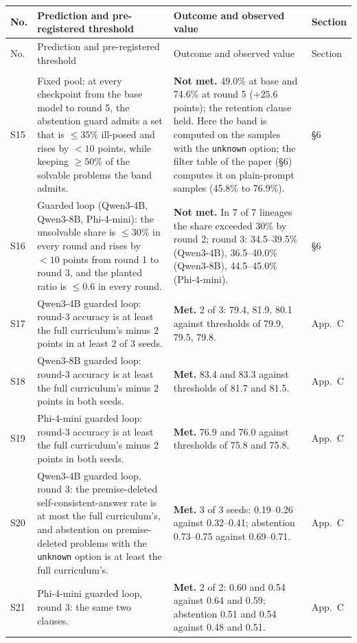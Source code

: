\documentclass[10pt,a4paper]{article}
\makeatletter
\newcommand{\unk}{\texttt{unknown}}
\newcommand{\met}{\textbf{Met.}}
\newcommand{\nmet}{\textbf{Not met.}}
\newcommand{\sub}[1]{\multicolumn{4}{@{}l}{\emph{#1}}\\\addlinespace[1pt]}
\makeatother
\begin{document}
\begingroup\small
\begin{longtable}{@{}L{0.9cm}L{7.8cm}L{6.1cm}L{1.3cm}@{}}
\toprule
No. & Prediction and pre-registered threshold & Outcome and observed value & Section \\
\midrule
\endfirsthead
\toprule
No. & Prediction and pre-registered threshold & Outcome and observed value & Section \\
\midrule
\endhead
\bottomrule
\endfoot
\sub{Abstention guard}
S15 & Fixed pool: at every checkpoint from the base model to round 5, the abstention guard admits a set that is $\le 35\%$ ill-posed and rises by $< 10$ points, while keeping $\ge 50\%$ of the solvable problems the band admits. & \nmet{} 49.0\% at base and 74.6\% at round 5 ($+25.6$ points); the retention clause held. Here the band is computed on the samples with the \unk{} option; the filter table of the paper (\S6) computes it on plain-prompt samples (45.8\% to 76.9\%). & \S6 \\
S16 & Guarded loop (Qwen3-4B, Qwen3-8B, Phi-4-mini): the unsolvable share is $\le 30\%$ in every round and rises by $< 10$ points from round 1 to round 3, and the planted ratio is $\le 0.6$ in every round. & \nmet{} In 7 of 7 lineages the share exceeded 30\% by round 2; round 3: 34.5--39.5\% (Qwen3-4B), 36.5--40.0\% (Qwen3-8B), 44.5--45.0\% (Phi-4-mini). & \S6 \\
S17 & Qwen3-4B guarded loop: round-3 accuracy is at least the full curriculum's minus 2 points in at least 2 of 3 seeds. & \met{} 2 of 3: 79.4, 81.9, 80.1 against thresholds of 79.9, 79.5, 79.8. & App.~C \\
S18 & Qwen3-8B guarded loop: round-3 accuracy is at least the full curriculum's minus 2 points in both seeds. & \met{} 83.4 and 83.3 against thresholds of 81.7 and 81.5. & App.~C \\
S19 & Phi-4-mini guarded loop: round-3 accuracy is at least the full curriculum's minus 2 points in both seeds. & \met{} 76.9 and 76.0 against thresholds of 75.8 and 75.8. & App.~C \\
S20 & Qwen3-4B guarded loop, round 3: the premise-deleted self-consistent-answer rate is at most the full curriculum's, and abstention on premise-deleted problems with the \unk{} option is at least the full curriculum's. & \met{} 3 of 3 seeds: 0.19--0.26 against 0.32--0.41; abstention 0.73--0.75 against 0.69--0.71. & App.~C \\
S21 & Phi-4-mini guarded loop, round 3: the same two clauses. & \met{} 2 of 2: 0.60 and 0.54 against 0.64 and 0.59; abstention 0.51 and 0.54 against 0.48 and 0.51. & App.~C \\

\end{longtable}
\end{document}
